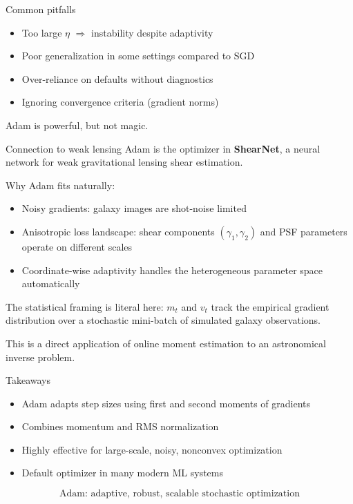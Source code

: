 \documentclass[compress]{beamer}
\begin{document}
\begin{frame}{Common pitfalls}
\begin{itemize}
\item Too large $\eta$ $\Rightarrow$ instability despite adaptivity
\item Poor generalization in some settings compared to SGD
\item Over-reliance on defaults without diagnostics
\item Ignoring convergence criteria (gradient norms)
\end{itemize}
Adam is powerful, but not magic.
\end{frame}

\begin{frame}{Connection to weak lensing}
Adam is the optimizer in \textbf{ShearNet}, a neural network for weak gravitational lensing shear estimation.

\medskip
Why Adam fits naturally:
\begin{itemize}
\item Noisy gradients: galaxy images are shot-noise limited
\item Anisotropic loss landscape: shear components $(\gamma_1, \gamma_2)$ and PSF parameters operate on different scales
\item Coordinate-wise adaptivity handles the heterogeneous parameter space automatically
\end{itemize}

\medskip
The statistical framing is literal here: $m_t$ and $v_t$ track the empirical gradient distribution over a stochastic mini-batch of simulated galaxy observations.

\medskip
{\small This is a direct application of online moment estimation to an astronomical inverse problem.}
\end{frame}

\begin{frame}{Takeaways}
\begin{itemize}
\item Adam adapts step sizes using first and second moments of gradients
\item Combines momentum and RMS normalization
\item Highly effective for large-scale, noisy, nonconvex optimization
\item Default optimizer in many modern ML systems
\end{itemize}

\[
\boxed{
\text{Adam: adaptive, robust, scalable stochastic optimization}
}
\]
\end{frame}
\end{document}
